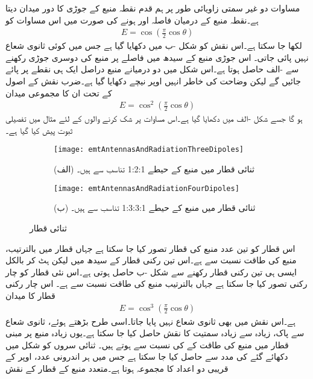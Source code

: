 مساوات  دو غیر سمتی زاویائی طور پر ہم قدم نقطہ منبع کے جوڑی کا دور میدان دیتا ہے۔نقطہ منبع کے درمیان فاصلہ  اور  ہونے کی صورت میں اس مساوات کو
\begin{align}
E=\cos \left(\frac{\pi}{2}\cos \theta\right)
\end{align}
لکھا جا سکتا ہے۔اس نقش کو شکل -ب میں دکھایا گیا ہے جس میں کوئی ثانوی شعاع نہیں پائی جاتی۔ اس جوڑی منبع کے سیدھ میں  فاصلے پر منبع کی دوسری جوڑی رکھنے سے -الف حاصل ہوتا ہے۔اس شکل میں دو درمیانے منبع دراصل ایک ہی نقطے پر پائے جائیں گے لیکن وضاحت کی خاطر انہیں اوپر نیچے دکھایا گیا ہے۔ضرب نقش کے اصول کے تحت ان کا مجموعی میدان
\begin{align}\label{مساوات_اینٹینا_تین_رکنی_قطار}
E=\cos^2 \left(\frac{\pi}{2}\cos \theta\right)
\end{align}
ہو گا جسے شکل -الف میں دکھایا گیا ہے۔اس مساوات پر شک کرنے والوں کے لئے  مثال  میں تفصیلی ثبوت پیش کیا گیا ہے۔
\begin{figure}
\centering
\begin{subfigure}{0.5\textwidth}
\centering
\texttt{[image: emtAntennasAndRadiationThreeDipoles]}
\caption*{(الف) ثنائی قطار میں منبع کے حیطے 1:2:1 تناسب سے ہیں۔}
\end{subfigure}%
\begin{subfigure}{0.5\textwidth}
\centering
\texttt{[image: emtAntennasAndRadiationFourDipoles]}
\caption*{(ب) ثنائی قطار میں منبع کے حیطے 1:3:3:1 تناسب سے ہیں۔}
\end{subfigure}%
\caption{ثنائی قطار}
\label{شکل_اینٹینا_ثنائی_قطار}
\end{figure}
اس قطار کو تین عدد منبع کی قطار تصور کیا جا سکتا ہے جہاں قطار میں بالترتیب، منبع کی طاقت  نسبت سے ہے۔اس تین رکنی قطار کے سیدھ میں لیکن  ہٹ کر بالکل ایسی ہی تین رکنی قطار رکھنے سے شکل -ب حاصل ہوتی ہے۔اس نئی قطار کو چار رکنی تصور کیا جا سکتا ہے جہاں بالترتیب منبع کی طاقت  نسبت سے ہے۔ اس چار رکنی قطار کا میدان
\begin{align}
E=\cos^3 \left(\frac{\pi}{2}\cos \theta\right)
\end{align}
ہے۔اس نقش میں بھی ثانوی شعاع نہیں پایا جاتا۔اسی طرح بڑھتے ہوئے، ثانوی شعاع سے پاک، زیادہ سے زیادہ سمتیت کا نقش حاصل کیا جا سکتا ہے۔یوں زیادہ منبع پر مبنی قطار میں منبع کی طاقت  کے  کی نسبت سے ہوتے ہیں۔ ثنائی سروں کو شکل  میں دکھائے گئے  کی مدد سے حاصل کیا جا سکتا ہے جس میں ہر اندرونی عدد، اوپر کے قریبی دو اعداد کا مجموعہ ہوتا ہے۔متعدد منبع کے قطار کے نقش

